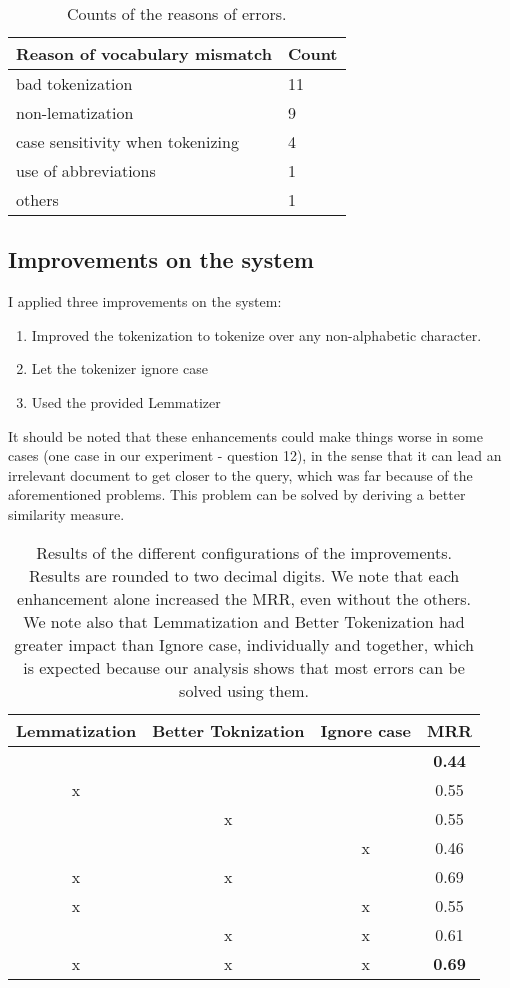 \documentclass{article}
\begin{document}
\begin{table}
\centering
\begin{tabular}{|l | l | }
  \hline
  \textbf{Reason of vocabulary mismatch} & \textbf{Count} \\
  \hline
bad tokenization & 11\\
non-lematization & 9\\
case sensitivity when tokenizing & 4\\
use of abbreviations & 1 \\
others & 1 \\
\hline
\end{tabular}
\caption{Counts of the reasons of errors.}
\label{tab:stat}
\end{table}

\subsection{Improvements on the system}

I applied three improvements on the system:

\begin{enumerate}
	\item Improved the tokenization to tokenize over any non-alphabetic character.
	\item Let the tokenizer ignore case
	\item Used the provided Lemmatizer
\end{enumerate}

It should be noted that these enhancements could make things worse in some cases (one case in our experiment - question 12), in the sense that it can lead an irrelevant document to get closer to the query, which was far because of the aforementioned problems. This problem can be solved by deriving a better similarity measure.

\begin{table}
\centering
\begin{tabular}{|c | c | c | c |}
  \hline
  \textbf{Lemmatization} & \textbf{Better Toknization} & \textbf{Ignore case} & \textbf{MRR} \\
  \hline
& & & \textbf{0.44}\\
  \hline
x & & & 0.55\\
  \hline
& x & & 0.55\\
  \hline
& & x & 0.46\\
  \hline
x & x & & 0.69\\
  \hline
x & & x & 0.55\\
  \hline
& x & x & 0.61\\
  \hline
    \hline
x & x & x & \textbf{0.69}\\
\hline
\end{tabular}
\caption{Results of the different configurations of the improvements. Results are rounded to two decimal digits. We note that each enhancement alone increased the MRR, even without the others. We note also that Lemmatization and Better Tokenization had greater impact than Ignore case, individually and together, which is expected because our analysis shows that most errors can be solved using them.}
\label{tab:res}
\end{table}
\end{document}
